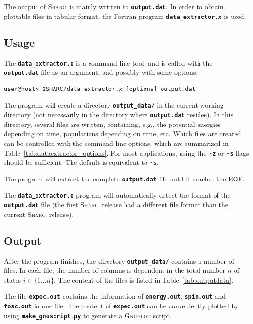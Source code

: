 \documentclass[a4paper,10pt,DIV=15,openany]{scrbook}
\newcommand{\sharc}{\textsc{Sharc}}
\newcommand{\ttt}[1]{\textbf{\texttt{#1}}}
\begin{document}
The output of \sharc\ is mainly written to \ttt{output.dat}. In order to obtain plottable files in tabular format, the Fortran program \ttt{data\_extractor.x} is used.

\subsection{Usage}

The \ttt{data\_extractor.x} is a command line tool, and is called with the \ttt{output.dat} file as an argument, and possibly with some options.
\begin{verbatim}
user@host> $SHARC/data_extractor.x [options] output.dat
\end{verbatim}
The program will create a directory \ttt{output\_data/} in the current working directory (not necessarily in the directory where \ttt{output.dat} resides). In this directory, several files are written, containing, e.g., the potential energies depending on time, populations depending on time, etc.
Which files are created can be controlled with the command line options, which are summarized in Table~\ref{tab:dataextractor_options}. For most applications, using the \ttt{-z} or \ttt{-s} flags should be sufficient. The default is equivalent to \ttt{-s}.

The program will extract the complete \ttt{output.dat} file until it reaches the EOF. 

The \ttt{data\_extractor.x} program will automatically detect the format of the \ttt{output.dat} file (the first \sharc\ release had a different file format than the current \sharc\ release).

\subsection{Output}

After the program finishes, the directory \ttt{output\_data/} contains a number of files. In each file, the number of columns is dependent in the total number $n$ of states $i\in\{1...n\}$. The content of the files is listed in Table~\ref{tab:outputdata}.

The file \ttt{expec.out} contains the information of \ttt{energy.out}, \ttt{spin.out} and \ttt{fosc.out} in one file. The content of \ttt{expec.out} can be conveniently plotted by using \ttt{make\_gnuscript.py} to generate a \textsc{Gnuplot} script.


\end{document}
